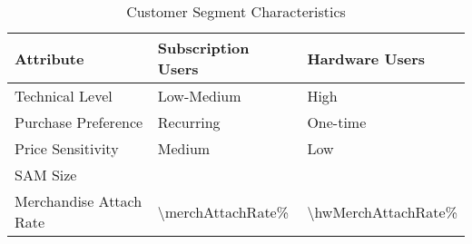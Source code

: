 \begin{table}[H]
\centering
\caption{Customer Segment Characteristics}
\begin{tabularx}{\linewidth}{l X X}
\toprule
Attribute & Subscription Users & Hardware Users \\\midrule
Technical Level & Low-Medium & High \\
Purchase Preference & Recurring & One-time \\
Price Sensitivity & Medium & Low \\
SAM Size & \numint{\samSubs}\cite{chainalysis2024,triple2023} & \numint{\samHw}\cite{chainalysis2024,triple2023} \\
Merchandise Attach Rate & \num{\merchAttachRate}\%\cite{shopify2024} & \num{\hwMerchAttachRate}\%\cite{shopify2024} \\
\bottomrule
\end{tabularx}
\end{table}
